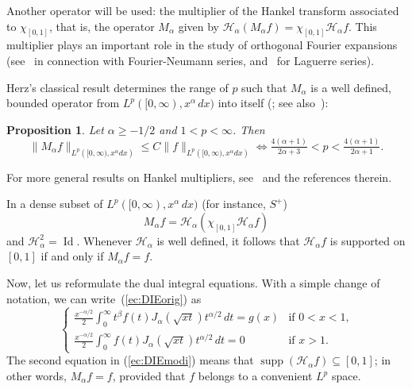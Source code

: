 \documentclass[12pt,leqno]{amsart}
\theoremstyle{plain}
\newtheorem{Pro}[Thm]{Proposition}
\newcommand{\supp}{\operatorname{supp}} %
\newcommand{\lpnorm}[3]{\|{#1}\|_{L^{#2}({#3})}} %
\newcommand{\Id}{\operatorname{Id}} %
\newcommand{\htra}{\mathcal{H}_\alpha} %
\begin{document}
Another operator will be used: the multiplier of the Hankel transform
associated to $\chi_{[0,1]}$, that is, the operator $M_\alpha$ given by
$\htra(M_\alpha f) =  \chi_{[0,1]} \htra f$. This multiplier plays an
important role in the study of orthogonal Fourier expansions (see~\cite{Var}
in connection with Fourier-Neumann series, and~\cite{Ste} for Laguerre
series).

Herz's classical result determines the range of $p$ such that $M_\alpha$ is a
well defined, bounded operator from $L^p([0,\infty), x^\alpha \, dx)$ into
itself (\cite{Her}; see also~\cite{Ste, Var}):

\begin{Pro}
\label{pro:acotMa}
Let $\alpha \ge -1/2$ and $1<p<\infty$. Then
\begin{equation*}
    \lpnorm{M_{\alpha}f}p{[0,\infty),x^{\alpha}dx}
      \le C \lpnorm{f}p{[0,\infty),x^{\alpha}dx} 
    \iff
    \tfrac{4(\alpha+1)}{2\alpha+3} < p < \tfrac{4(\alpha+1)}{2\alpha+1}.
\end{equation*}
\end{Pro}

For more general results on Hankel multipliers, see~\cite{St-Tr} and the
references therein.

In a dense subset of $L^p([0,\infty),
x^\alpha
\, dx)$ (for instance, $S^+$)
\begin{equation*}
    M_{\alpha}f = \htra(\chi_{[0,1]}\htra f)
\end{equation*}
and $\htra^2 = \Id$. Whenever $\htra$ is well defined, it follows that $\htra
f$ is supported on $[0,1]$ if and only if $M_\alpha f = f$.

Now, let us reformulate the dual integral equations.
With a simple change of notation, we can write~(\ref{ec:DIEorig}) as
\begin{equation}
    \label{ec:DIEmodi}
    \left\{
      \begin{array}{ll}
      \displaystyle \frac{x^{-\alpha/2}}{2} \int_0^\infty t^{\beta} f(t)
        J_\alpha(\sqrt{xt}) t^{\alpha/2}\,dt = g(x)&
          \text{if $0<x<1$,} \\[9pt]
      \displaystyle \frac{x^{-\alpha/2}}{2} \int_0^\infty f(t)
        J_\alpha(\sqrt{xt}) t^{\alpha/2}\,dt = 0&
          \text{if $x>1$}.
      \end{array}
    \right.
\end{equation}
The second equation in (\ref{ec:DIEmodi}) means that $\supp (\htra f)
\subseteq [0,1]$; in other words, $M_{\alpha}f = f$, provided that $f$
belongs to a convenient $L^p$ space.
\end{document}
